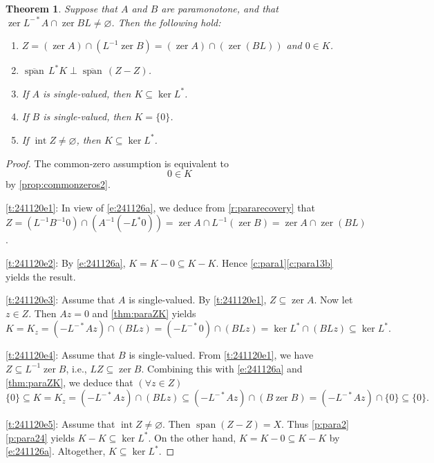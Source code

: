 \documentclass{article}
\newcommand{\inte}{\ensuremath{\operatorname{int}}}
\newcommand{\zer}{\ensuremath{\operatorname{zer}}}
\newcommand{\cspan}{\ensuremath{\overline{\operatorname{span}}\,}}
\newtheorem{theorem}{Theorem}[section]
\providecommand{\spn}{\operatorname{span}}
\begin{document}
\begin{theorem}
\label{t:241120e}
Suppose that $A$ and $B$ are paramonotone, and that 
$\zer L^{-*}A\cap\zer BL\neq\varnothing$. 
Then the following hold:
\begin{enumerate}
\item 
\label{t:241120e1}
$Z=(\zer A)\cap(L^{-1}\zer B)=(\zer A)\cap(\zer (BL))$ and $0\in K$.
\item 
\label{t:241120e2}
$\cspan L^* K\perp \cspan(Z-Z)$. 
\item 
\label{t:241120e3}
If $A$ is single-valued, then $K\subseteq \ker L^*$. 
\item 
\label{t:241120e4}
If $B$ is single-valued, then $K=\{0\}$.
\item 
\label{t:241120e5}
If $\inte Z\neq\varnothing$, then $K\subseteq \ker L^*$. 
\end{enumerate}
\end{theorem}
\begin{proof}
The common-zero assumption is equivalent to 
\begin{equation}
\label{e:241126a}
0\in K
\end{equation}
by \cref{prop:commonzeros2}. 

\cref{t:241120e1}:
In view of \cref{e:241126a}, we deduce from \cref{r:pararecovery} that  
$Z = (L^{-1}B^{-1}0) \cap (A^{-1}(-L^*0)) = \zer A \cap L^{-1}(\zer B) 
= \zer A \cap \zer(BL)$. 

\cref{t:241120e2}: 
By \cref{e:241126a}, 
$K = K-0 \subseteq K-K$.
Hence 
\cref{c:para1}\cref{c:para13b} yields the result. 

\cref{t:241120e3}: 
Assume that $A$ is single-valued. 
By \cref{t:241120e1}, $Z\subseteq\zer A$. 
Now let $z\in Z$. 
Then $Az=0$ and
\cref{thm:paraZK} yields 
\begin{equation}
K=K_z=(-L^{-*}Az)\cap (BLz)=(-L^{-*}0)\cap(BLz)=\ker L^*\cap (BLz) \subseteq \ker L^*. 
\end{equation}

\cref{t:241120e4}: 
Assume that $B$ is single-valued. 
From \cref{t:241120e1}, we have $Z\subseteq L^{-1}\zer B$, 
i.e., $LZ \subseteq\zer B$. 
Combining this with \cref{e:241126a} and
\cref{thm:paraZK}, we deduce that 
$(\forall z\in Z)$ 
\begin{equation}
\label{e:241120e}
\{0\}\subseteq K=K_z=(-L^{-*}Az)\cap (BLz)\subseteq(-L^{-*}Az)\cap(B\zer B)=
(-L^{-*}Az) \cap \{0\} \subseteq\{0\}. 
\end{equation}

\cref{t:241120e5}: 
Assume that $\inte Z\neq\varnothing$. 
Then $\spn(Z-Z) = X$. 
Thus \cref{p:para2}\cref{p:para24} yields 
$K-K \subseteq \ker L^*$.
On the other hand, 
$K = K-0 \subseteq K-K$ by \cref{e:241126a}.
Altogether, $K\subseteq \ker L^*$. 
\end{proof}
\end{document}
